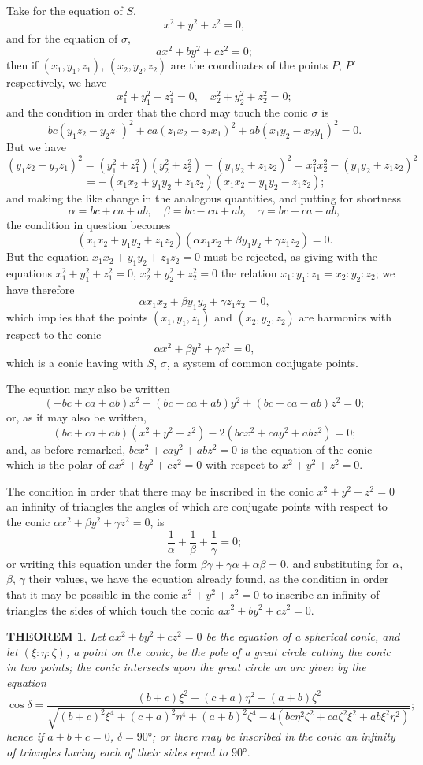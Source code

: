 \documentclass[11pt,a4paper]{article}
\theoremstyle{plain}
\newtheorem{theorem}{THEOREM}
\begin{document}
Take for the equation of $S$,
\[
x^2 + y^2 + z^2 = 0,
\]
and for the equation of $\sigma$,
\[
ax^2 + by^2 + cz^2 = 0;
\]
then if $(x_1, y_1, z_1)$, $(x_2, y_2, z_2)$ are the coordinates of the points $P$, $P'$ respectively, we have
\[
x_1^2 + y_1^2 + z_1^2 = 0, \quad x_2^2 + y_2^2 + z_2^2 = 0;
\]
and the condition in order that the chord may touch the conic $\sigma$ is
\[
bc(y_1z_2 - y_2z_1)^2 + ca(z_1x_2 - z_2x_1)^2 + ab(x_1y_2 - x_2y_1)^2 = 0.
\]
But we have
\[
(y_1z_2 - y_2z_1)^2 = (y_1^2 + z_1^2)(y_2^2 + z_2^2) - (y_1y_2 + z_1z_2)^2 = x_1^2x_2^2 - (y_1y_2 + z_1z_2)^2
\]
\[
= -(x_1x_2 + y_1y_2 + z_1z_2)(x_1x_2 - y_1y_2 - z_1z_2);
\]
and making the like change in the analogous quantities, and putting for shortness
\[
\alpha = bc + ca + ab, \quad \beta = bc - ca + ab, \quad \gamma = bc + ca - ab,
\]
the condition in question becomes
\[
(x_1x_2 + y_1y_2 + z_1z_2)(\alpha x_1x_2 + \beta y_1y_2 + \gamma z_1z_2) = 0.
\]
But the equation $x_1x_2 + y_1y_2 + z_1z_2 = 0$ must be rejected, as giving with the equations $x_1^2 + y_1^2 + z_1^2 = 0$, $x_2^2 + y_2^2 + z_2^2 = 0$ the relation $x_1:y_1:z_1 = x_2:y_2:z_2$; we have therefore
\[
\alpha x_1x_2 + \beta y_1y_2 + \gamma z_1z_2 = 0,
\]
which implies that the points $(x_1, y_1, z_1)$ and $(x_2, y_2, z_2)$ are harmonics with respect to the conic
\[
\alpha x^2 + \beta y^2 + \gamma z^2 = 0,
\]
which is a conic having with $S$, $\sigma$, a system of common conjugate points.

The equation may also be written
\[
(-bc + ca + ab)x^2 + (bc - ca + ab)y^2 + (bc + ca - ab)z^2 = 0;
\]
or, as it may also be written,
\[
(bc + ca + ab)(x^2 + y^2 + z^2) - 2(bcx^2 + cay^2 + abz^2) = 0;
\]
and, as before remarked, $bcx^2 + cay^2 + abz^2 = 0$ is the equation of the conic which is the polar of $ax^2 + by^2 + cz^2 = 0$ with respect to $x^2 + y^2 + z^2 = 0$.

The condition in order that there may be inscribed in the conic $x^2 + y^2 + z^2 = 0$ an infinity of triangles the angles of which are conjugate points with respect to the conic $\alpha x^2 + \beta y^2 + \gamma z^2 = 0$, is
\[
\frac{1}{\alpha} + \frac{1}{\beta} + \frac{1}{\gamma} = 0;
\]
or writing this equation under the form $\beta\gamma + \gamma\alpha + \alpha\beta = 0$, and substituting for $\alpha$, $\beta$, $\gamma$ their values, we have the equation already found, as the condition in order that it may be possible in the conic $x^2 + y^2 + z^2 = 0$ to inscribe an infinity of triangles the sides of which touch the conic $ax^2 + by^2 + cz^2 = 0$.
\newpage

\begin{theorem}
Let $ax^2 + by^2 + cz^2 = 0$ be the equation of a spherical conic, and let $(\xi:\eta:\zeta)$, a point on the conic, be the pole of a great circle cutting the conic in two points; the conic intersects upon the great circle an arc given by the equation
\[
\cos\delta = \frac{(b+c)\xi^2 + (c+a)\eta^2 + (a+b)\zeta^2}{\sqrt{(b+c)^2\xi^4 + (c+a)^2\eta^4 + (a+b)^2\zeta^4 - 4(bc\eta^2\zeta^2 + ca\zeta^2\xi^2 + ab\xi^2\eta^2)}};
\]
hence if $a+b+c=0$, $\delta = 90°$; or there may be inscribed in the conic an infinity of triangles having each of their sides equal to $90°$.
\end{theorem}
\end{document}
